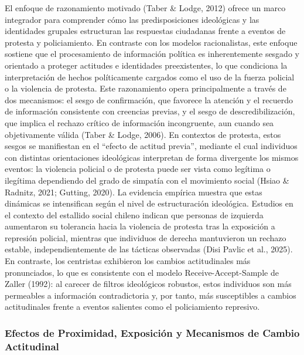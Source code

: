 \documentclass[
  13pt,
]{article}
\begin{document}
El enfoque de razonamiento motivado (Taber \& Lodge, 2012) ofrece un
marco integrador para comprender cómo las predisposiciones ideológicas y
las identidades grupales estructuran las respuestas ciudadanas frente a
eventos de protesta y policiamiento. En contraste con los modelos
racionalistas, este enfoque sostiene que el procesamiento de información
política es inherentemente sesgado y orientado a proteger actitudes e
identidades preexistentes, lo que condiciona la interpretación de hechos
políticamente cargados como el uso de la fuerza policial o la violencia
de protesta. Este razonamiento opera principalmente a través de dos
mecanismos: el sesgo de confirmación, que favorece la atención y el
recuerdo de información consistente con creencias previas, y el sesgo de
descredibilización, que implica el rechazo crítico de información
incongruente, aun cuando sea objetivamente válida (Taber \& Lodge,
2006). En contextos de protesta, estos sesgos se manifiestan en el
``efecto de actitud previa'', mediante el cual individuos con distintas
orientaciones ideológicas interpretan de forma divergente los mismos
eventos: la violencia policial o de protesta puede ser vista como
legítima o ilegítima dependiendo del grado de simpatía con el movimiento
social (Hsiao \& Radnitz, 2021; Gutting, 2020). La evidencia empírica
muestra que estas dinámicas se intensifican según el nivel de
estructuración ideológica. Estudios en el contexto del estallido social
chileno indican que personas de izquierda aumentaron su tolerancia hacia
la violencia de protesta tras la exposición a represión policial,
mientras que individuos de derecha mantuvieron un rechazo estable,
independientemente de las tácticas observadas (Disi Pavlic et al.,
2025). En contraste, los centristas exhibieron los cambios actitudinales
más pronunciados, lo que es consistente con el modelo
Receive-Accept-Sample de Zaller (1992): al carecer de filtros
ideológicos robustos, estos individuos son más permeables a información
contradictoria y, por tanto, más susceptibles a cambios actitudinales
frente a eventos salientes como el policiamiento represivo.

\subsubsection{Efectos de Proximidad, Exposición y Mecanismos de Cambio
Actitudinal}\label{efectos-de-proximidad-exposiciuxf3n-y-mecanismos-de-cambio-actitudinal}
\end{document}
